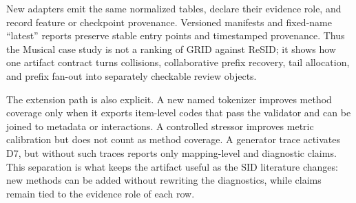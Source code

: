 New adapters emit the same normalized tables, declare their evidence role, and
record feature or checkpoint provenance. Versioned manifests and fixed-name
``latest'' reports preserve stable entry points and timestamped provenance.
Thus the Musical case study is not a ranking of GRID against ReSID; it shows
how one artifact contract turns collisions, collaborative prefix recovery, tail
allocation, and prefix fan-out into separately checkable review objects.

The extension path is also explicit. A new named tokenizer improves method
coverage only when it exports item-level codes that pass the validator and can
be joined to metadata or interactions. A controlled stressor improves metric
calibration but does not count as method coverage. A generator trace activates
D7, but without such traces \tool reports only mapping-level and diagnostic
claims. This separation is what keeps the artifact useful as the SID literature
changes: new methods can be added without rewriting the diagnostics, while
claims remain tied to the evidence role of each row.
